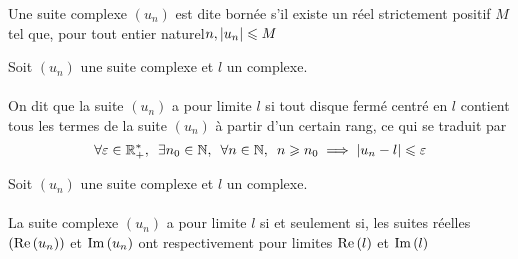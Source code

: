 \begin{defi}
    Une suite complexe \((u_n)\) est dite bornée s'il existe un réel strictement positif \(M\) tel que, pour tout entier naturel\(n, \left\lvert u_n\right\rvert\leqslant M\)
\end{defi}
\begin{defi}
    Soit \((u_n)\) une suite complexe et \(l\) un complexe.\\~\\
    On dit que la suite \((u_n)\) a pour limite \(l\) si tout disque fermé centré en \(l\) contient tous les termes de la suite \((u_n)\) à partir d'un certain rang, ce qui se traduit par 
    \[\quantifs{\forall \epsilon \in\Rps;\exists n_0 \in \N; \forall n \in \N}  n\geq n_0\imp \abs{u_n - l}\leq \epsilon\]
\end{defi}
\begin{defprop}
    Soit \((u_n)\) une suite complexe et \(l\) un complexe.\\~\\
    La suite complexe \((u_n)\) a pour limite \(l\) si et seulement si, les suites réelles \((\operatorname{Re}\left(u_n\right))\) et \(\operatorname{Im}\left(u_n\right)\) ont respectivement pour limites \(\operatorname{Re}\left(l\right)\) et \(\operatorname{Im}\left(l\right)\)
\end{defprop}